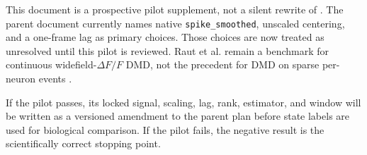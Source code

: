 \documentclass[11pt,a4paper]{article}
\begin{document}
This document is a prospective pilot supplement, not a silent rewrite of
. The parent document currently
names native \texttt{spike\_smoothed}, unscaled centering, and a one-frame lag as
primary choices. Those choices are now treated as unresolved until this pilot is
reviewed. Raut et al. remain a benchmark for continuous widefield-$\Delta F/F$
DMD, not the precedent for DMD on sparse per-neuron events \citep{raut2025}.

If the pilot passes, its locked signal, scaling, lag, rank, estimator, and window
will be written as a versioned amendment to the parent plan before state labels
are used for biological comparison. If the pilot fails, the negative result is
the scientifically correct stopping point.

\clearpage
\sloppy


\end{document}
